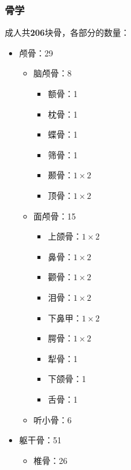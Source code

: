 \subsubsection{骨学}%
\label{subsub:复习：骨学}
\begin{notation}
    成人共\textbf{206}块骨，各部分的数量：
    \begin{itemize}
        \item 颅骨：29
            \begin{itemize}
                \item 脑颅骨：8
                    \begin{itemize}
                        \item 额骨：1
                        \item 枕骨：1
                        \item 蝶骨：1
                        \item 筛骨：1
                        \item 颞骨：$1\times 2$
                        \item 顶骨：$1\times 2$
                    \end{itemize}
                \item 面颅骨：15
                    \begin{itemize}
                        \item 上颌骨：$1\times 2$
                        \item 鼻骨：$1\times 2$
                        \item 颧骨：$1\times 2$
                        \item 泪骨：$1\times 2$
                        \item 下鼻甲：$1\times 2$
                        \item 腭骨：$1\times 2$
                        \item 犁骨：1
                        \item 下颌骨：1
                        \item 舌骨：1
                    \end{itemize}
                \item 听小骨：6
            \end{itemize}
        \item 躯干骨：51
            \begin{itemize}
                \item 椎骨：26
                    \begin{itemize}

\end{itemize}
\end{itemize}
\end{itemize}
\end{notation}
